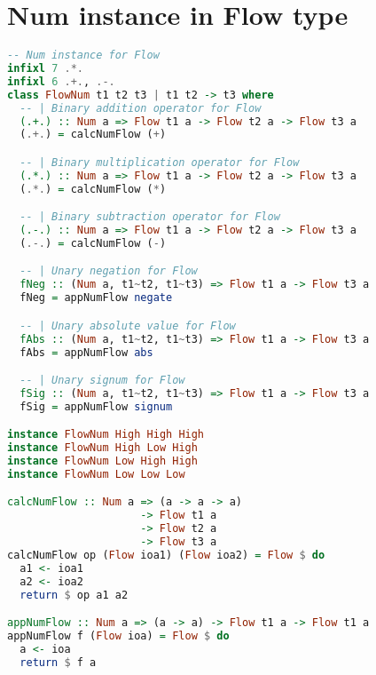 \chapter{Num instance in Flow type}
\label{app:num_type}
\begin{lstlisting}[language=Haskell]
-- Num instance for Flow
infixl 7 .*.
infixl 6 .+., .-.
class FlowNum t1 t2 t3 | t1 t2 -> t3 where
  -- | Binary addition operator for Flow
  (.+.) :: Num a => Flow t1 a -> Flow t2 a -> Flow t3 a
  (.+.) = calcNumFlow (+)

  -- | Binary multiplication operator for Flow
  (.*.) :: Num a => Flow t1 a -> Flow t2 a -> Flow t3 a
  (.*.) = calcNumFlow (*)

  -- | Binary subtraction operator for Flow
  (.-.) :: Num a => Flow t1 a -> Flow t2 a -> Flow t3 a
  (.-.) = calcNumFlow (-)

  -- | Unary negation for Flow
  fNeg :: (Num a, t1~t2, t1~t3) => Flow t1 a -> Flow t3 a
  fNeg = appNumFlow negate

  -- | Unary absolute value for Flow
  fAbs :: (Num a, t1~t2, t1~t3) => Flow t1 a -> Flow t3 a
  fAbs = appNumFlow abs

  -- | Unary signum for Flow
  fSig :: (Num a, t1~t2, t1~t3) => Flow t1 a -> Flow t3 a
  fSig = appNumFlow signum

instance FlowNum High High High
instance FlowNum High Low High
instance FlowNum Low High High
instance FlowNum Low Low Low

calcNumFlow :: Num a => (a -> a -> a)
                     -> Flow t1 a
                     -> Flow t2 a
                     -> Flow t3 a
calcNumFlow op (Flow ioa1) (Flow ioa2) = Flow $ do
  a1 <- ioa1
  a2 <- ioa2
  return $ op a1 a2

appNumFlow :: Num a => (a -> a) -> Flow t1 a -> Flow t1 a
appNumFlow f (Flow ioa) = Flow $ do
  a <- ioa
  return $ f a
\end{lstlisting}
